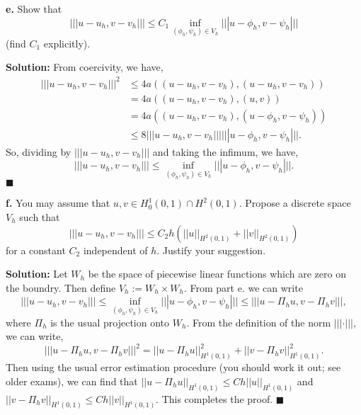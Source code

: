 \documentclass[11pt]{article}
\begin{document}
\vskip 2cm



\textbf{e.} Show that
\begin{equation}
    |||u-u_h,v-v_h||| \leq C_1 \inf_{(\phi_h,\psi_h) \in V_h} |||u-\phi_h,v-\psi_h|||
\end{equation}
(find $C_1$ explicitly).

\vskip 1cm


\textbf{Solution:} From coercivity, we have,
\begin{align*}
    |||u - u_h, v - v_h|||^2 &\leq 4 a((u - u_h, v - v_h), (u - u_h, v - v_h)) \\
    &= 4a((u - u_h, v - v_h), (u,v)) \\
    &= 4a((u - u_h, v - v_h), (u - \phi_h, v - \psi_h)) \\
    &\leq 8|||u - u_h, v - v_h||| |||u - \phi_h, v - \psi_h|||.
\end{align*}
So, dividing by $|||u - u_h, v - v_h|||$ and taking the infimum, we have,
\begin{equation*}
    |||u - u_h, v - v_h||| \leq \inf_{(\phi_h, \psi_h)\in V_h} |||u - \phi_h, v - \psi_h|||.
\end{equation*}
$\blacksquare$



\vskip 2cm




\textbf{f.} You may assume that $u,v \in H^1_0(0,1) \cap H^2(0,1)$.
Propose a discrete space $V_h$ such that
\begin{equation}
    |||u-u_h,v-v_h||| \leq C_2h(||u||_{H^2(0,1)} + ||v||_{H^2(0,1)})
\end{equation}
for a constant $C_2$ independent of $h$.
Justify your suggestion.

\vskip 1cm


\textbf{Solution:} Let $W_h$ be the space of piecewise linear functions which are zero on the boundry.
Then define $V_h := W_h\times W_h$.
From part e. we can write
\begin{equation*}
    |||u - u_h, v - v_h||| \leq \inf_{(\phi_h, \psi_h) \in V_h} |||u - \phi_h, v - \psi_h||| \leq |||u - \Pi_h u, v - \Pi_h v |||,
\end{equation*}
where $\Pi_h$ is the usual projection onto $W_h$.
From the definition of the norm $|||\cdot |||$, we can write,
\begin{equation*}
    |||u - \Pi_h u, v - \Pi_h v |||^2 = ||u - \Pi_h u||^2_{H^1(0,1)} + ||v - \Pi_h v||^2_{H^1(0,1)}.
\end{equation*}
Then using the usual error estimation procedure (you should work it out; see older exams), we can find that $||u - \Pi_h u ||_{H^1(0,1)} \leq Ch||u||_{H^1(0,1)}$ and $||v - \Pi_h v ||_{H^1(0,1)} \leq Ch||v||_{H^1(0,1)}$.
This completes the proof.
$\blacksquare$
\end{document}
